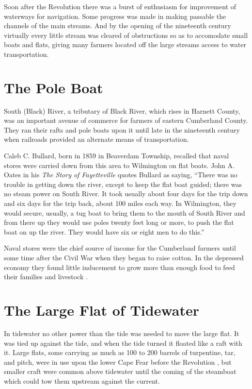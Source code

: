 \documentclass[11pt, a5paper]{book}
\begin{document}
Soon after the Revolution there was a burst of enthusiasm for
improvement of waterways for navigation.  Some progress was made in
making passable the channels of the main streams.  And by the opening
of the nineteenth century virtually every little stream was cleared of
obstructions so as to accomodate small boats and flats, giving many
farmers located off the large streams access to water
transportation.\par

\section*{The Pole Boat}

South (Black) River, a tributary of Black River, which rises in
Harnett County, was an important avenue of commerce for farmers of
eastern Cumberland County.  They ran their rafts and pole boats upon
it until late in the nineteenth century when railroads provided an
alternate means of transportation.\par

Caleb C. Bullard, born in 1859 in Beaverdam Township, recalled that
naval stores were carried down from this area to Wilmington on flat
boats.  John A. Oates in his \textit{The Story of Fayetteville} quotes
Bullard as saying, ``There was no trouble in getting down the river,
except to keep the flat boat guided; there was no steam power on South
River.  It took usually about four days for the trip down and six days
for the trip back, about 100 miles each way.  In Wilmington, they
would secure, usually, a tug boat to bring them to the mouth of South
River and from there up they would use poles twenty feet long or more,
to push the flat boat on up the river.  They would have six or eight
men to do this.''\par

Naval stores were the chief source of income for the Cumberland
farmers until some time after the Civil War when they began to raise
cotton.  In the depressed economy they found little inducement to grow
more than enough food to feed their families and livestock
\citep[432]{oatesja}.\par

\section*{The Large Flat of Tidewater}

In tidewater no other power than the tide was needed to move the large
flat.  It was tied up against the tide, and when the tide turned it
floated like a raft with it.  Large flats, some carrying as much as 100
to 200 barrels of turpentine, tar, and pitch, were in use upon the
lower Cape Fear before the Revolution \citep[184-185]{schawj}, but
smaller craft were common above tidewater until the coming of the
steamboat which could tow them upstream against the current.\par
\end{document}
